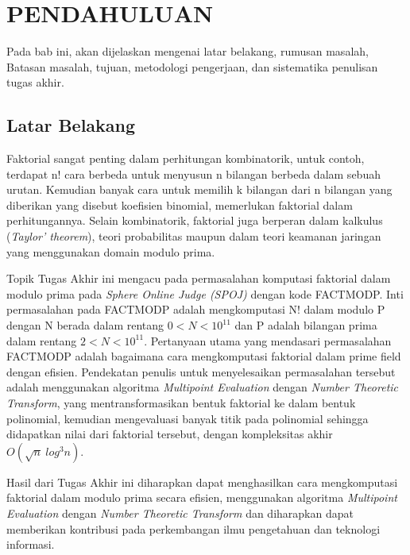 \vspace{0ex}
\chapter {PENDAHULUAN}

Pada bab ini, akan dijelaskan mengenai latar belakang, rumusan masalah, Batasan masalah, tujuan, metodologi pengerjaan, dan sistematika penulisan tugas akhir.

\section{ Latar Belakang}

\par Faktorial sangat penting dalam perhitungan kombinatorik, untuk contoh, terdapat n! cara berbeda untuk menyusun n bilangan berbeda dalam sebuah urutan. Kemudian banyak cara untuk memilih k bilangan dari n bilangan yang diberikan yang disebut koefisien binomial, memerlukan faktorial dalam perhitungannya. Selain kombinatorik, faktorial juga berperan dalam kalkulus (\textit{Taylor’ theorem}), teori probabilitas maupun dalam teori keamanan jaringan yang menggunakan domain modulo prima.

\par Topik Tugas Akhir ini mengacu pada permasalahan komputasi faktorial dalam modulo prima pada \textit{Sphere Online Judge (SPOJ)} dengan kode FACTMODP\cite{factmodp}. Inti permasalahan pada FACTMODP\cite{factmodp} adalah mengkomputasi N! dalam modulo P dengan N berada dalam rentang $ 0 < N < 10^{11} $ dan P adalah bilangan prima dalam rentang $ 2 < N < 10^{11} $. Pertanyaan utama yang mendasari permasalahan FACTMODP\cite{factmodp} adalah bagaimana cara mengkomputasi faktorial dalam prime field dengan efisien. Pendekatan penulis untuk menyelesaikan permasalahan tersebut adalah menggunakan algoritma \textit{Multipoint Evaluation} dengan \textit{Number Theoretic Transform}, yang mentransformasikan bentuk faktorial ke dalam bentuk polinomial, kemudian mengevaluasi banyak titik pada polinomial sehingga didapatkan nilai dari faktorial tersebut, dengan kompleksitas akhir $ O(\sqrt{n}\ log^3  n) $.

\par Hasil dari Tugas Akhir ini diharapkan dapat menghasilkan cara mengkomputasi faktorial dalam modulo prima secara efisien, menggunakan algoritma \textit{Multipoint Evaluation} dengan \textit{Number Theoretic Transform} dan diharapkan dapat memberikan kontribusi pada perkembangan ilmu pengetahuan dan teknologi informasi.

